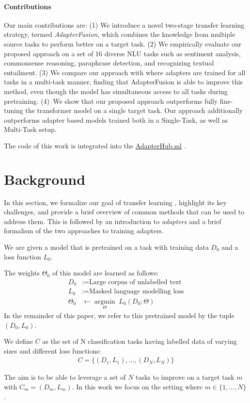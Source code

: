 \paragraph{Contributions} Our main contributions are: (1) We introduce a novel two-stage transfer learning strategy, termed \textit{AdapterFusion}, which combines the knowledge from multiple source tasks to perform better on a target task. (2) We empirically evaluate our proposed approach on a set of 16 diverse NLU tasks such as sentiment analysis, commonsense reasoning, paraphrase detection, and recognizing textual entailment. (3) We compare our approach with 
\citet{stickland2019bert} where  adapters are trained for all tasks in a multi-task manner, finding that AdapterFusion is able to improve this method, even though the model has simultaneous access to all tasks during pretraining. (4)~We show that our proposed approach outperforms fully fine-tuning the transformer model on a single target task. Our approach additionally outperforms adapter based models trained both in a Single-Task, as well as Multi-Task setup. 

The code of this work is integrated into the \href{https://AdapterHub.ml}{AdapterHub.ml} \cite{pfeiffer2020AdapterHub}.

\section{Background}
\label{task}

In this section, we formalize our goal of transfer learning \cite{pan2009survey, torrey2010transfer, ruder2019neural}, highlight its key challenges, and provide a brief overview of common methods that can be used to address them. This is followed by an introduction to \emph{adapters} \cite{rebuffi2017learning} and a brief formalism of the two approaches to training adapters.

\begin{defn}
We are given a model that is pretrained on a task with training data $D_0$ and a loss function $L_0$. 

The weights $\Theta_0$ of this model are learned as follows:
\begin{align*}
    D_0&:=\textrm{Large corpus of unlabelled text} \\
    L_0&:= \textrm{Masked language modelling loss} \\
    \Theta_0 &\leftarrow \underset{\Theta}{\operatorname{argmin}}\;L_0(D_0;\Theta) 
\end{align*}
In the remainder of this paper, we refer to this pretrained model by the tuple $( D_0, L_0)$.

We define $C$ as the set of N classification tasks having labelled data of varying sizes and different loss functions: 
\begin{gather*}
    C = \{ ( D_1, L_1), \ldots ,(D_N, L_N)\}
\end{gather*}

The aim is to be able to leverage a set of $N$ tasks to improve on a target task $m$ with $C_m = { ( D_m, L_m)}$. In this work we  focus on the setting where $m \in \{1,\ldots, N\}$. 
\end{defn}


